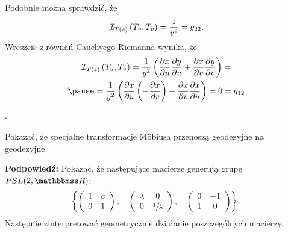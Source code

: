 \begin{frame}
Podobnie można sprawdzić, że 
\[\mathcal{I}_{T(z)}\left(T_v,T_v\right)=\frac{1}{v^2}=g_{22}.\]
\pause Wreszcie z równań Cauchyego-Riemanna wynika, że
\begin{multline*}
\mathcal{I}_{T(z)}\le(T_u,T_v\ri)=
\frac{1}{y^2}\le(\frac{\partial x}{\partial u}\frac{\partial y}{\partial u}+\frac{\partial x}{\partial v}\frac{\partial y}{\partial v}\ri)=\\\pause
=\frac{1}{y^2}\le(\frac{\partial x}{\partial u}\le(-\frac{\partial x}{\partial v}\ri)+\frac{\partial x}{\partial v}\frac{\partial x}{\partial u}\ri)=0=g_{12}
\end{multline*}

\hfill $\square$

\end{frame}
\begin{frame}

\begin{exercise}
Pokazać, że specjalne transformacje M\"obiusa przenoszą geodezyjne na geodezyjne. 

\pause\footnotesize{\textbf{Podpowiedź:} Pokazać, że następujące macierze generują grupę $PSL(2,\R)$: 
\[\left\{\left(\begin{array}{cc}
     1 & c\\
	0 & 1\\
     \end{array}
\right),\quad \left(\begin{array}{cc}
     \lambda & 0\\
	0 & \sfrac{1}{\lambda}\\
     \end{array}
\right),\quad\left(\begin{array}{cc}
     0& -1\\
	1 & 0\\
     \end{array}
\right)\right\}.\]
Następnie zinterpretować geometrycznie działanie poszczególnych macierzy.}
\end{exercise}

\end{frame}
